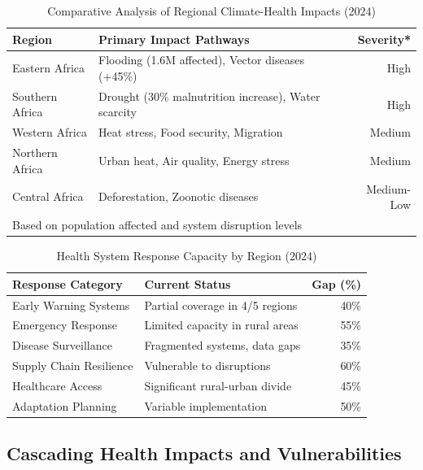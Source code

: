 \begin{table}[ht]
\footnotesize
\caption{Comparative Analysis of Regional Climate-Health Impacts (2024)}
\label{tab:regional_comparison}
\begin{tabularx}{\columnwidth}{@{}lXr@{}}
\toprule
\textbf{Region} & \textbf{Primary Impact Pathways} & \textbf{Severity*} \\
\midrule
Eastern Africa & Flooding (1.6M affected), Vector diseases (+45\%) & High \\
Southern Africa & Drought (30\% malnutrition increase), Water scarcity & High \\
Western Africa & Heat stress, Food security, Migration & Medium \\
Northern Africa & Urban heat, Air quality, Energy stress & Medium \\
Central Africa & Deforestation, Zoonotic diseases & Medium-Low \\
\bottomrule
\multicolumn{3}{l}{\footnotesize *Based on population affected and system disruption levels}
\end{tabularx}
\end{table}

\begin{table}[ht]
\footnotesize
\caption{Health System Response Capacity by Region (2024)}
\label{tab:response_capacity}
\begin{tabularx}{\columnwidth}{@{}lXr@{}}
\toprule
\textbf{Response Category} & \textbf{Current Status} & \textbf{Gap (\%)} \\
\midrule
Early Warning Systems & Partial coverage in 4/5 regions & 40\% \\
Emergency Response & Limited capacity in rural areas & 55\% \\
Disease Surveillance & Fragmented systems, data gaps & 35\% \\
Supply Chain Resilience & Vulnerable to disruptions & 60\% \\
Healthcare Access & Significant rural-urban divide & 45\% \\
Adaptation Planning & Variable implementation & 50\% \\
\bottomrule
\end{tabularx}
\end{table}

\subsection{Cascading Health Impacts and Vulnerabilities}

